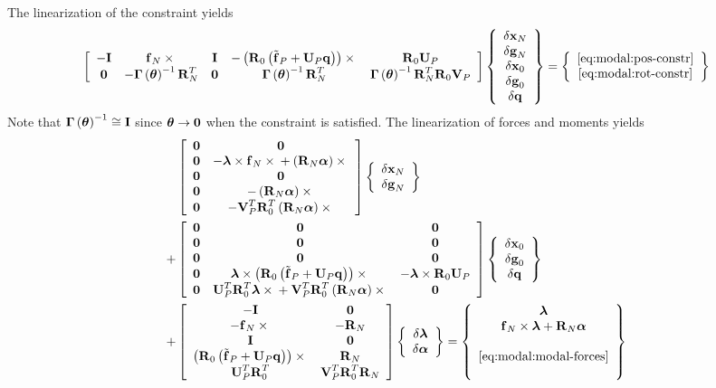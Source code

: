 The linearization of the constraint yields
\begin{equation}
	\sqbr{\matr{ccccc}{
		-\T{I} & \T{f}_N \times{} & \T{I} & -\plbr{\T{R}_0\plbr{\tilde{\T{f}}_P + \T{U}_P \T{q}}}\times{} & \T{R}_0 \T{U}_P \\
		\T{0} & -\T{\Gamma}\plbr{\T{\theta}}^{-1} \T{R}_N^T & \T{0} & \T{\Gamma}\plbr{\T{\theta}}^{-1} \T{R}_N^T & \T{\Gamma}\plbr{\T{\theta}}^{-1} \T{R}_N^T \T{R}_0 \T{V}_P
	}}\cubr{\cvvect{
		\delta\T{x}_N \\
		\delta\T{g}_N \\
		\delta\T{x}_0 \\
		\delta\T{g}_0 \\
		\delta\T{q}
	}} = \cubr{\cvvect{
			\eqref{eq:modal:pos-constr} \\
			\eqref{eq:modal:rot-constr}
	}}
\end{equation}
Note that $\T{\Gamma}\plbr{\T{\theta}}^{-1}\cong\T{I}$
since $\T{\theta}\rightarrow\T{0}$ when the constraint is satisfied.
The linearization of forces and moments yields
\begin{align}
	&\sqbr{\matr{cc}{
		\T{0} & \T{0} \\
		\T{0} & -\T{\lambda}\times\T{f}_N\times{} + \plbr{\T{R}_N \T{\alpha}}\times{} \\
		\T{0} & \T{0} \\
		\T{0} & -\plbr{\T{R}_N \T{\alpha}}\times{} \\
		\T{0} & -\T{V}_P^T \T{R}_0^T \plbr{\T{R}_N \T{\alpha}}\times{}
	}}\cubr{\cvvect{
		\delta\T{x}_N \\
		\delta\T{g}_N
	}} \\
	+& \sqbr{\matr{ccc}{
		\T{0} & \T{0} & \T{0} \\
		\T{0} & \T{0} & \T{0} \\
		\T{0} & \T{0} & \T{0} \\
		\T{0} & \T{\lambda}\times\plbr{\T{R}_0\plbr{\tilde{\T{f}}_P + \T{U}_P \T{q}}}\times{} & -\T{\lambda}\times\T{R}_0 \T{U}_P \\
		\T{0} & \T{U}_P^T \T{R}_0^T \T{\lambda}\times{} + \T{V}_P^T \T{R}_0^T \plbr{\T{R}_N \T{\alpha}} \times{} & \T{0}
	}}\cubr{\cvvect{
		\delta\T{x}_0 \\
		\delta\T{g}_0 \\
		\delta\T{q}
	}} \nonumber \\
	+& \sqbr{\matr{cc}{
		-\T{I} & \T{0} \\
		-\T{f}_N\times{} & -\T{R}_N \\
		\T{I} & \T{0} \\
		\plbr{\T{R}_0\plbr{\tilde{\T{f}}_P + \T{U}_P \T{q}}}\times{} & \T{R}_N \\
		\T{U}_P^T \T{R}_0^T & \T{V}_P^T \T{R}_0^T \T{R}_N
	}}\cubr{\cvvect{
		\delta\T{\lambda} \\
		\delta\T{\alpha}
	}} = \cubr{\cvvect{
			\T{\lambda} \\
			\T{f}_N \times \T{\lambda} + \T{R}_N \T{\alpha} \\
			\\
			\eqref{eq:modal:modal-forces} \\
			\mbox{}
	}} \nonumber
\end{align}


